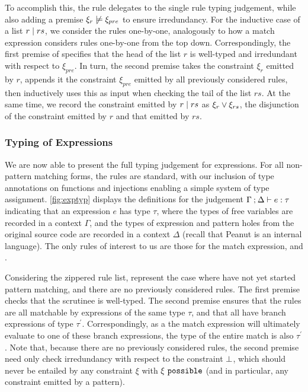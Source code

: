To accomplish this, the rule \TOneRules delegates to the single rule typing judgement, while also adding a premise $\cnotsatisfy{\xi_{r}}{\xi_{pre}}$ to ensure irredundancy. For the inductive case of a list $r \mid rs$, we consider the rules one-by-one, analogously to how a match expression considers rules one-by-one from the top down. Correspondingly, the first premise of \TRules specifies that the head of the list $r$ is well-typed and irredundant with respect to $\xi_{pre}$. In turn, the second premise takes the constraint $\xi_r$ emitted by $r$, appends it the constraint $\xi_{pre}$ emitted by all previously considered rules, then inductively uses this as input when checking the tail of the list $rs$. At the same time, we record the constraint emitted by $r \mid rs$ as $\xi_r \vee \xi_{rs}$, the disjunction of the constraint emitted by $r$ and that emitted by $rs$.



\subsubsection{Typing of Expressions}
 We are now able to present the full typing judgement for expressions. For all non-pattern matching forms, the rules are standard, with our inclusion of type annotations on functions and injections enabling a simple system of type assignment. \autoref{fig:exptyp} displays the definitions for the judgement $\Gamma \mathbin{;} \Delta \vdash e : \tau$ indicating that an expression $e$ has type $\tau$, where the types of free variables are recorded in a context $\Gamma$, and the types of expression and pattern holes from the original source code are recorded in a context $\Delta$ (recall that Peanut is an internal language). The only rules of interest to us are those for the match expression, \TMatchZPre and \TMatchNZPre.
 
Considering the zippered rule list, \TMatchZPre represent the case where have not yet started pattern matching, and there are no previously considered rules. The first premise checks that the scrutinee is well-typed. The second premise ensures that the rules are all matchable by expressions of the same type $\tau$, and that all have branch expressions of type $\tau^\prime$. Correspondingly, as a the match expression will ultimately evaluate to one of these branch expressions, the type of the entire match is also $\tau^\prime$. Note that, because there are no previously considered rules, the second premise need only check irredundancy with respect to the constraint $\bot$, which should never be entailed by any constraint $\xi$ with $\xi ~\mathtt{possible}$ (and in particular, any constraint emitted by a pattern).

